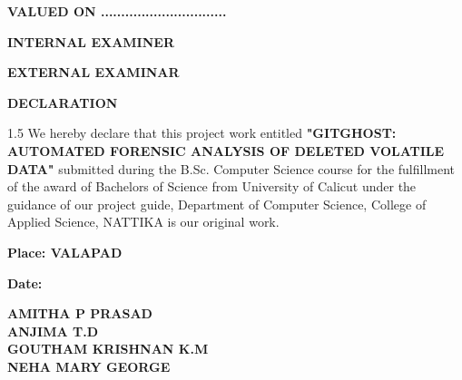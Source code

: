 \documentclass[12pt, a4paper, oneside]{report}
\begin{document}
\vspace{1cm}
\noindent \textbf{VALUED ON ...............................} \par 
\vspace{0.6cm}
\noindent \textbf{INTERNAL EXAMINER} \par
\vspace{0.6cm}
\noindent \textbf{EXTERNAL EXAMINAR} \par
\vfill
\newpage

\begin{center}
    {\Large \textbf{DECLARATION} \par}
\end{center}
\vspace{1cm}
\begin{spacing}{1.5}
We hereby declare that this project work entitled \textbf{"GITGHOST: AUTOMATED FORENSIC ANALYSIS OF DELETED VOLATILE DATA"} submitted during the B.Sc. Computer Science course for the fulfillment of the award of Bachelors of Science from University of Calicut under the guidance of our project guide, Department of Computer Science, College of Applied Science, NATTIKA is our original work.
\end{spacing}

\vspace{3cm}
\noindent \textbf{Place: VALAPAD} \par
\vspace{0.5cm}
\noindent \textbf{Date:} 

\vspace{1cm}
\begin{flushright}
    \textbf{AMITHA P PRASAD} \\
    \textbf{ANJIMA T.D} \\
    \textbf{GOUTHAM KRISHNAN K.M} \\
    \textbf{NEHA MARY GEORGE}
\end{flushright}
\newpage
\end{document}
